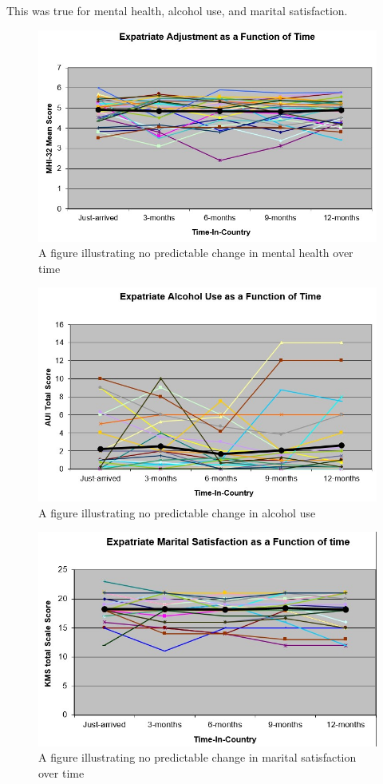 \documentclass[
  english,
]{book}
\begin{document}
This was true for mental health, alcohol use, and marital satisfaction.

\begin{figure}
\centering
\includegraphics{images/Qualitative/expatMHI.jpg}
\caption{A figure illustrating no predictable change in mental health over time}
\end{figure}

\begin{figure}
\centering
\includegraphics{images/Qualitative/expatAlcohol.jpg}
\caption{A figure illustrating no predictable change in alcohol use}
\end{figure}

\begin{figure}
\centering
\includegraphics{images/Qualitative/expatKMS.jpg}
\caption{A figure illustrating no predictable change in marital satisfaction over time}
\end{figure}
\end{document}
